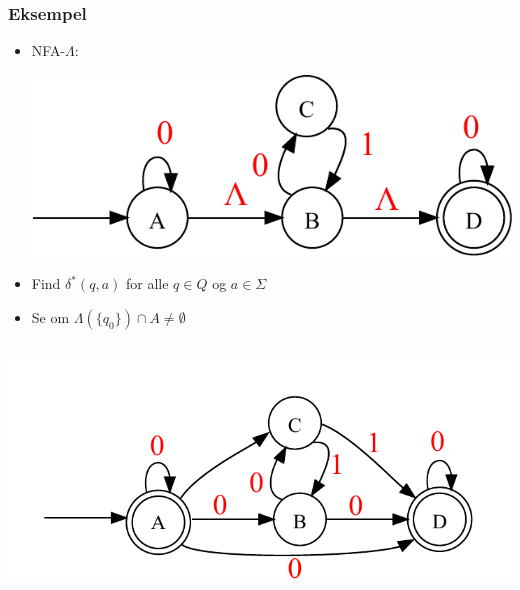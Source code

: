 \begin{frame}
\frametitle{Eksempel}
\begin{itemize}[<+->]
\item NFA-$\Lambda$:
\begin{center}
  \includegraphics[scale=0.4]{images/2_seminar_lambdaelim}
\end{center}
\item Find $\delta^*(q,a)$ for alle $q\in Q$ og $a\in \Sigma$
\item Se om $\Lambda(\{q_0\})\cap A \neq \emptyset$
\end{itemize}

\begin{columns}
\column{5cm}
\column{5cm}
  \includegraphics[scale=0.4]{images/2_seminar_lambdaelim2}
\end{columns}
\end{frame}

